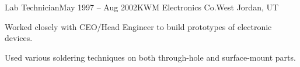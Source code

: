 
\def\PositionTitle{Lab Technician}
\def\PositionPeriod{May 1997 -- Aug 2002} %
\def\OrgName{KWM Electronics Co.}
\def\OrgLocation{West Jordan, UT}


\begin{rExperience}{\PositionTitle}{\PositionPeriod}{\OrgName}{\OrgLocation}

  \item Worked closely with CEO/Head Engineer to build prototypes of electronic devices.

  \item Used various soldering techniques on both through-hole and surface-mount parts.

\end{rExperience}
